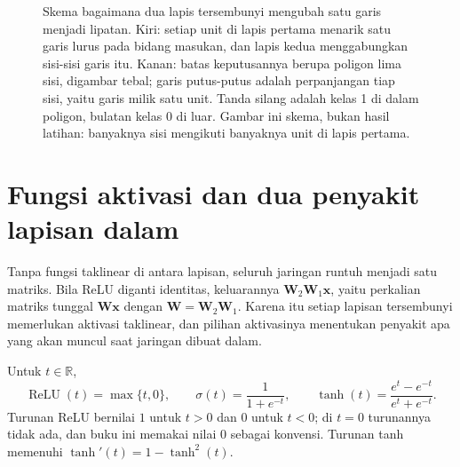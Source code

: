 \begin{figure}[htbp]
\caption{Skema bagaimana dua lapis tersembunyi mengubah satu garis menjadi lipatan.
Kiri: setiap unit di lapis pertama menarik satu garis lurus pada bidang masukan, dan
lapis kedua menggabungkan sisi-sisi garis itu. Kanan: batas keputusannya berupa poligon
lima sisi, digambar tebal; garis putus-putus adalah perpanjangan tiap sisi, yaitu garis
milik satu unit. Tanda silang adalah kelas 1 di dalam poligon, bulatan kelas 0 di luar.
Gambar ini skema, bukan hasil latihan: banyaknya sisi mengikuti banyaknya unit di lapis
pertama.}
\label{fig:dua-lapis}
\end{figure}


\section{Fungsi aktivasi dan dua penyakit lapisan dalam}

Tanpa fungsi taklinear di antara lapisan, seluruh jaringan runtuh menjadi satu matriks. Bila
ReLU diganti identitas, keluarannya $\mathbf{W}_{2}\mathbf{W}_{1}\mathbf{x}$, yaitu
perkalian matriks tunggal $\mathbf{W}\mathbf{x}$ dengan
$\mathbf{W}=\mathbf{W}_{2}\mathbf{W}_{1}$. Karena itu setiap lapisan tersembunyi memerlukan
aktivasi taklinear, dan pilihan aktivasinya menentukan penyakit apa yang akan muncul saat
jaringan dibuat dalam.


\begin{definisi}
Untuk $t\in\mathbb{R}$,
\[
  \operatorname{ReLU}(t)=\max\{t,0\},\qquad
  \sigma(t)=\frac{1}{1+e^{-t}},\qquad
  \tanh(t)=\frac{e^{t}-e^{-t}}{e^{t}+e^{-t}} .
\]
Turunan ReLU bernilai $1$ untuk $t>0$ dan $0$ untuk $t<0$; di $t=0$ turunannya tidak ada,
dan buku ini memakai nilai $0$ sebagai konvensi. Turunan tanh memenuhi
$\tanh'(t)=1-\tanh^{2}(t)$.
\end{definisi}

